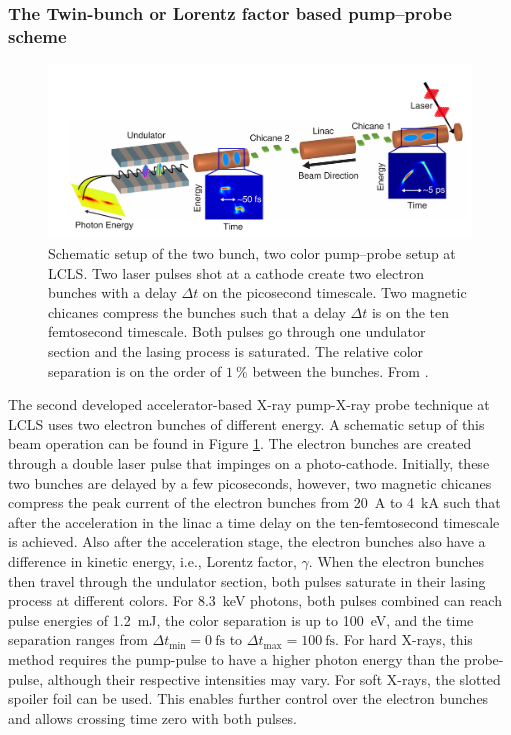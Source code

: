 \subsubsection{The Twin-bunch or Lorentz factor based pump--probe scheme}\label{sec:twin-bunch-pump-probe}
\begin{figure}
	\centering
		\includegraphics[width=1.00\textwidth]{images/Agos-pump-probe-scheme.png}
	\caption[Schematic setup of a bunch based pump-probe setup.]{Schematic setup of the two bunch, two color pump--probe setup at LCLS. Two laser pulses shot at a cathode create two electron bunches with a delay $\Delta t$ on the picosecond timescale. Two magnetic chicanes compress the bunches such that a delay $\Delta t$ is on the ten femtosecond timescale. Both pulses go through one undulator section and the lasing process is saturated. The relative color separation is on the order of $\SI{1}{\percent}$ between the bunches. From \citep[\href{http://creativecommons.org/licenses/by/4.0/}{\ccby}]{Marinelli-2015-NatComm}.}
	\label{fig:Agos-pump-probe-scheme}
\end{figure}
The second developed accelerator-based X-ray pump-X-ray probe technique at LCLS \citep{Marinelli-2015-NatComm} uses two electron bunches of different energy. A schematic setup of this beam operation can be found in Figure \ref{fig:Agos-pump-probe-scheme}. The electron bunches are created through a double laser pulse that impinges on a photo-cathode. Initially, these two bunches are delayed by a few picoseconds, however, two magnetic chicanes compress the peak current of the electron bunches from \SI{20}{\ampere} to \SI{4}{\kilo\ampere} such that after the acceleration in the linac a time delay on the ten-femtosecond timescale is achieved. Also after the acceleration stage, the electron bunches also have a difference in kinetic energy, i.e., Lorentz factor, $\gamma$. When the electron bunches then travel through the undulator section, both pulses saturate in their lasing process at different colors. For \SI{8.3}{\kilo\electronvolt} photons, both pulses combined can reach pulse energies of \SI{1.2}{\milli\joule}, the color separation is up to \SI{100}{\electronvolt}, and the time separation ranges from $\Delta t_{\text{min}}=\SI{0}{\femto\second}$ to $\Delta t_{\text{max}}=\SI{100}{\femto\second}$. For hard X-rays, this method requires the pump-pulse to have a higher photon energy than the probe-pulse, although their respective intensities may vary. For soft X-rays, the slotted spoiler foil can be used. This enables further control over the electron bunches and allows crossing time zero with both pulses.
